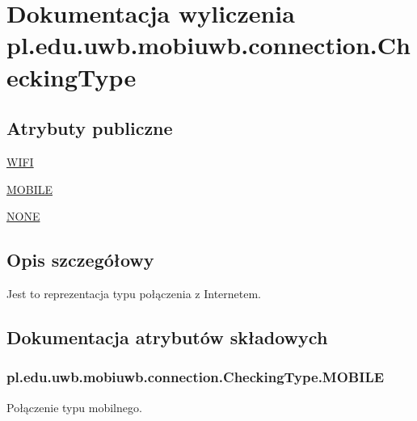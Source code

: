 \hypertarget{enumpl_1_1edu_1_1uwb_1_1mobiuwb_1_1connection_1_1_checking_type}{}\section{Dokumentacja wyliczenia pl.\+edu.\+uwb.\+mobiuwb.\+connection.\+Checking\+Type}
\label{enumpl_1_1edu_1_1uwb_1_1mobiuwb_1_1connection_1_1_checking_type}
\subsection*{Atrybuty publiczne}
\begin{DoxyCompactItemize}
\item 
\hyperlink{enumpl_1_1edu_1_1uwb_1_1mobiuwb_1_1connection_1_1_checking_type_a1ef367074b29fb99e5d6d8f624a5a05e}{W\+I\+F\+I}
\item 
\hyperlink{enumpl_1_1edu_1_1uwb_1_1mobiuwb_1_1connection_1_1_checking_type_a6ac754e44be778f321dc72bc2190f152}{M\+O\+B\+I\+L\+E}
\item 
\hyperlink{enumpl_1_1edu_1_1uwb_1_1mobiuwb_1_1connection_1_1_checking_type_a77141ca6eef0f4727ab8953b8c7242eb}{N\+O\+N\+E}
\end{DoxyCompactItemize}


\subsection{Opis szczegółowy}
Jest to reprezentacja typu połączenia z Internetem. 

\subsection{Dokumentacja atrybutów składowych}
\hypertarget{enumpl_1_1edu_1_1uwb_1_1mobiuwb_1_1connection_1_1_checking_type_a6ac754e44be778f321dc72bc2190f152}{}
\subsubsection[{M\+O\+B\+I\+L\+E}]{\setlength{\rightskip}{0pt plus 5cm}pl.\+edu.\+uwb.\+mobiuwb.\+connection.\+Checking\+Type.\+M\+O\+B\+I\+L\+E}\label{enumpl_1_1edu_1_1uwb_1_1mobiuwb_1_1connection_1_1_checking_type_a6ac754e44be778f321dc72bc2190f152}
Połączenie typu mobilnego. \hypertarget{enumpl_1_1edu_1_1uwb_1_1mobiuwb_1_1connection_1_1_checking_type_a77141ca6eef0f4727ab8953b8c7242eb}{}
